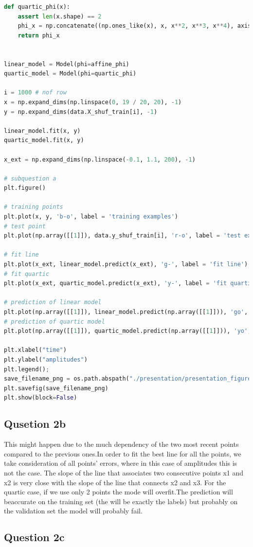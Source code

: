 \documentclass{article}
\begin{document}
\begin{lstlisting}[language = Python]
def quartic_phi(x):
    assert len(x.shape) == 2
    phi_x = np.concatenate((np.ones_like(x), x, x**2, x**3, x**4), axis=1)
    return phi_x


linear_model = Model(phi=affine_phi)
quartic_model = Model(phi=quartic_phi)

i = 1000 # nof row
x = np.expand_dims(np.linspace(0, 19 / 20, 20), -1)
y = np.expand_dims(data.X_shuf_train[i], -1)

linear_model.fit(x, y)
quartic_model.fit(x, y)

x_ext = np.expand_dims(np.linspace(-0.1, 1.1, 200), -1)

# subquestion a
plt.figure()

# training points
plt.plot(x, y, 'b-o', label = 'training examples')
# test point
plt.plot(np.array([[1]]), data.y_shuf_train[i], 'r-o', label = 'test examples')

# fit line
plt.plot(x_ext, linear_model.predict(x_ext), 'g-', label = 'fit line')
# fit quartic
plt.plot(x_ext, quartic_model.predict(x_ext), 'y-', label = 'fit quartic')

# prediction of linear model
plt.plot(np.array([[1]]), linear_model.predict(np.array([[1]])), 'go', label = '$\hat{y}_{lin}$')
# prediction of quartic model
plt.plot(np.array([[1]]), quartic_model.predict(np.array([[1]])), 'yo', label = '$\hat{y}_{quartic}$')

plt.xlabel("time")
plt.ylabel("amplitudes")
plt.legend();
save_filename_png = os.path.abspath("./presentation/presentation_figures/fig_03.pdf")
plt.savefig(save_filename_png)
plt.show(block=False)

\end{lstlisting}

\subsection{Qusetion 2b}
This might happen due to the much dependency of the two most recent points compared to the previous ones.In order to fit the best line for all the points, we take consideration of all points’ errors, where in this case of amplitudes this is not the case. The slope of the line that associates two consecutive points x1 and x2 is very close with the slope of the line that connects x2 and x3. For the quartic case, if we use only 2 points the mode will overfit.The prediction will beaccurate on the training set (the will be exactly the labels) but probably on the validation set the model will probably fail.

\subsection{Question 2c}
\end{document}
